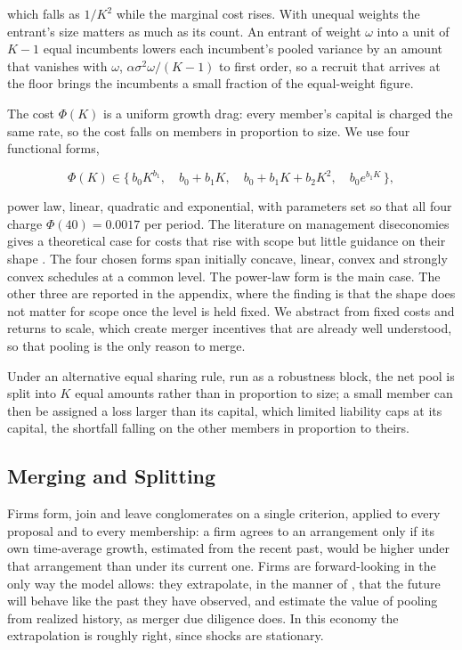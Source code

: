 \documentclass[12pt,a4paper]{article}
\begin{document}
which falls as $1/K^2$ while the marginal cost rises. With unequal weights the entrant's size matters as much as its count. An entrant of weight $\omega$ into a unit of $K - 1$ equal incumbents lowers each incumbent's pooled variance by an amount that vanishes with $\omega$, $\alpha \sigma^2 \omega / (K - 1)$ to first order, so a recruit that arrives at the floor brings the incumbents a small fraction of the equal-weight figure.

The cost $\Phi(K)$ is a uniform growth drag: every member's capital is charged the same rate, so the cost falls on members in proportion to size. We use four functional forms,

$$\Phi(K) \in \bigl\{\, b_0 K^{b_1},\quad b_0 + b_1 K,\quad b_0 + b_1 K + b_2 K^2,\quad b_0 e^{b_1 K} \,\bigr\},$$

power law, linear, quadratic and exponential, with parameters set so that all four charge $\Phi(40) = 0.0017$ per period. The literature on management diseconomies gives a theoretical case for costs that rise with scope \parencite{coase19883,williamson1967hierarchical} but little guidance on their shape \parencite{canback2006diseconomies}. The four chosen forms span initially concave, linear, convex and strongly convex schedules at a common level. The power-law form is the main case. The other three are reported in the appendix, where the finding is that the shape does not matter for scope once the level is held fixed. We abstract from fixed costs and returns to scale, which create merger incentives that are already well understood, so that pooling is the only reason to merge.

Under an alternative equal sharing rule, run as a robustness block, the net pool is split into $K$ equal amounts rather than in proportion to size; a small member can then be assigned a loss larger than its capital, which limited liability caps at its capital, the shortfall falling on the other members in proportion to theirs.

\subsection{Merging and Splitting\label{sec:decision}}

Firms form, join and leave conglomerates on a single criterion, applied to every proposal and to every membership: a firm agrees to an arrangement only if its own time-average growth, estimated from the recent past, would be higher under that arrangement than under its current one. Firms are forward-looking in the only way the model allows: they extrapolate, in the manner of \textcite{simon1955behavioral}, that the future will behave like the past they have observed, and estimate the value of pooling from realized history, as merger due diligence does. In this economy the extrapolation is roughly right, since shocks are stationary.
\end{document}
